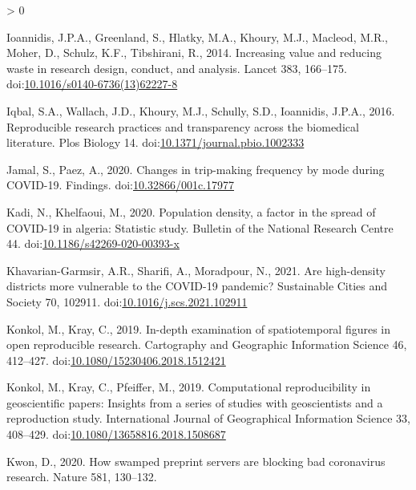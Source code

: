 \documentclass[]{elsarticle} %
\newlength{\cslhangindent}
\newenvironment{CSLReferences}[2] %
 {%
  \setlength{\parindent}{0pt}
  \ifodd #1 \everypar{\setlength{\hangindent}{\cslhangindent}}\ignorespaces\fi
  \ifnum #2 > 0
  \setlength{\parskip}{#2\baselineskip}
  \fi
 }%
 {}
\begin{document}
\begin{CSLReferences}{1}{0}
\leavevmode\hypertarget{ref-Ioannidis2014increasing}{}%
Ioannidis, J.P.A., Greenland, S., Hlatky, M.A., Khoury, M.J., Macleod,
M.R., Moher, D., Schulz, K.F., Tibshirani, R., 2014. Increasing value
and reducing waste in research design, conduct, and analysis. Lancet
383, 166--175.
doi:\href{https://doi.org/10.1016/s0140-6736(13)62227-8}{10.1016/s0140-6736(13)62227-8}

\leavevmode\hypertarget{ref-Iqbal2016reproducible}{}%
Iqbal, S.A., Wallach, J.D., Khoury, M.J., Schully, S.D., Ioannidis,
J.P.A., 2016. Reproducible research practices and transparency across
the biomedical literature. Plos Biology 14.
doi:\href{https://doi.org/10.1371/journal.pbio.1002333}{10.1371/journal.pbio.1002333}

\leavevmode\hypertarget{ref-Jamal2020Changes}{}%
Jamal, S., Paez, A., 2020. Changes in trip-making frequency by mode
during COVID-19. Findings.
doi:\href{https://doi.org/10.32866/001c.17977}{10.32866/001c.17977}

\leavevmode\hypertarget{ref-Kadi2020population}{}%
Kadi, N., Khelfaoui, M., 2020. Population density, a factor in the
spread of COVID-19 in algeria: Statistic study. Bulletin of the National
Research Centre 44.
doi:\href{https://doi.org/10.1186/s42269-020-00393-x}{10.1186/s42269-020-00393-x}

\leavevmode\hypertarget{ref-Khavarian2021high}{}%
Khavarian-Garmsir, A.R., Sharifi, A., Moradpour, N., 2021. Are
high-density districts more vulnerable to the COVID-19 pandemic?
Sustainable Cities and Society 70, 102911.
doi:\href{https://doi.org/10.1016/j.scs.2021.102911}{10.1016/j.scs.2021.102911}

\leavevmode\hypertarget{ref-Konkol2019examination}{}%
Konkol, M., Kray, C., 2019. In-depth examination of spatiotemporal
figures in open reproducible research. Cartography and Geographic
Information Science 46, 412--427.
doi:\href{https://doi.org/10.1080/15230406.2018.1512421}{10.1080/15230406.2018.1512421}

\leavevmode\hypertarget{ref-Konkol2019computational}{}%
Konkol, M., Kray, C., Pfeiffer, M., 2019. Computational reproducibility
in geoscientific papers: Insights from a series of studies with
geoscientists and a reproduction study. International Journal of
Geographical Information Science 33, 408--429.
doi:\href{https://doi.org/10.1080/13658816.2018.1508687}{10.1080/13658816.2018.1508687}

\leavevmode\hypertarget{ref-Kwon2021swamped}{}%
Kwon, D., 2020. How swamped preprint servers are blocking bad
coronavirus research. Nature 581, 130--132.


\end{CSLReferences}
\end{document}
